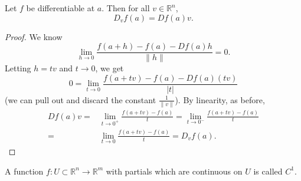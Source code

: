 \documentclass[12pt]{article}
\begin{document}
\begin{proposition}
	Let $f$ be differentiable at $a$. Then for all $v\in\mathbb{R}^n$, 
	\begin{equation*}
		D_vf(a) = Df(a)v.
	\end{equation*}
\end{proposition}
\begin{proof}
	We know 
	\begin{equation*}
		\lim_{h\to 0}\frac{f(a+h)-f(a)-Df(a)h}{\|h\|}=0.
	\end{equation*}
	Letting $h=tv$ and $t\to 0$, we get 
	\begin{equation*}
		0 = \lim_{t\to 0}\frac{f(a+tv)-f(a)-Df(a)(tv)}{|t|}
	\end{equation*}
	(we can pull out and discard the constant $\frac{1}{\|v\|}$). By linearity, as before, 
	\begin{align*}
		Df(a)v =& \lim_{t\to 0^+}\frac{f(a+tv)-f(a)}{t} = \lim_{t\to 0^-}\frac{f(a+tv)-f(a)}{t} \\
		=& \lim_{t\to 0}\frac{f(a+tv)-f(a)}{t} = D_vf(a).
	\end{align*}
\end{proof}

\begin{definition}
	A function $f:U\subset\mathbb{R}^n\to\mathbb{R}^m$ with partials which are continuous on $U$ is called \emph{$C^1$}.
\end{definition}
\end{document}
